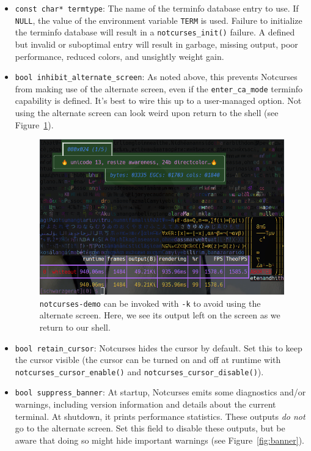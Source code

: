 \documentclass[letterpaper,10pt]{article}
\newenvironment{denseitemize}{
  \begin{itemize}
      \setlength{\itemsep}{0pt}
}{
  \end{itemize}
}
\begin{document}
\begin{denseitemize}
\item{\texttt{const char* termtype}: The name of the terminfo database entry to
    use. If \texttt{NULL}, the value of the environment variable \texttt{TERM}
    is used. Failure to initialize the terminfo database will result in a
    \texttt{notcurses\_init()} failure.} A defined but invalid or suboptimal
    entry will result in garbage, missing output, poor performance, reduced
    colors, and unsightly weight gain.
\item{\texttt{bool inhibit\_alternate\_screen}: As noted above, this prevents
    Notcurses from making use of the alternate screen, even if the \texttt{enter\_ca\_mode}
    terminfo capability is defined. It's best to wire this up to a user-managed
    option. Not using the alternate screen can look weird upon return to the
    shell (see Figure~\ref{fig:altscreen}).

\begin{figure}[!htbp]
\centering \includegraphics[width=.7\linewidth]{media/no-alternate-screen.png}
\caption[Inhibiting use of the alternate screen.]{\texttt{notcurses-demo} can be invoked with \texttt{-k} to avoid
  using the alternate screen. Here, we see its output left on the screen as
  we return to our shell.}
\label{fig:altscreen}
\end{figure}
  }
\item{\texttt{bool retain\_cursor}: Notcurses hides the cursor by default.
    Set this to keep the cursor visible (the cursor can be turned on and off
    at runtime with \texttt{notcurses\_cursor\_enable()} and
    \texttt{notcurses\_cursor\_disable()}).}
\item{\texttt{bool suppress\_banner}: At startup, Notcurses emits some
    diagnostics and/or warnings, including version information and details
    about the current terminal. At shutdown, it prints performance statistics.
    These outputs \textit{do not} go to the alternate screen. Set this
    field to disable these outputs, but be aware that doing so might hide
    important warnings (see Figure~\ref{fig:banner}).

}
\end{denseitemize}
\end{document}
